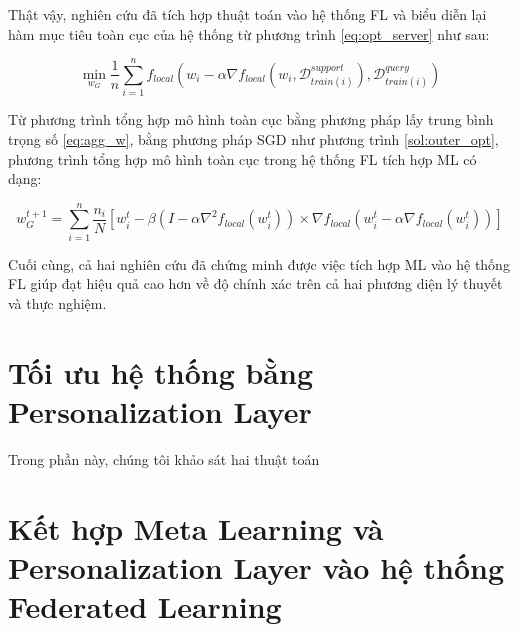 Thật vậy, nghiên cứu \cite{fallah2020personalized} đã tích hợp thuật toán  vào hệ thống FL và biểu diễn lại hàm mục tiêu toàn cục của hệ thống từ phương trình \ref{eq:opt_server} như sau:

\begin{equation}
    \label{eq:opt_meta_fl}
    \min_{w_G} \frac{1}{n} \sum_{i=1}^n f_{local}\left(w_i - \alpha \nabla f_{local}(w_i, \mathcal{D}_{train(i)}^{support}), \mathcal{D}_{train(i)}^{query}\right)
\end{equation}

Từ phương trình tổng hợp mô hình toàn cục bằng phương pháp lấy trung bình trọng số \ref{eq:agg_w}, bằng phương pháp SGD như phương trình \ref{sol:outer_opt}, phương trình tổng hợp mô hình toàn cục trong hệ thống FL tích hợp ML có dạng:

\begin{dmath}
    w_G^{t+1} = \sum_{i=1}^n{\frac{n_i}{N}\left[ w_i^t - \beta \left( I - \alpha \nabla^2 f_{local}(w_i^t) \right) \times \nabla f_{local}\left( w_i^t - \alpha\nabla f_{local}(w_i^t)\right) \right]}
\end{dmath}

Cuối cùng, cả hai nghiên cứu \parencite{chen2018federated, fallah2020personalized} đã chứng minh được việc tích hợp ML vào hệ thống FL giúp đạt hiệu quả cao hơn  về độ chính xác trên cả hai phương diện lý thuyết và thực nghiệm.

\section{Tối ưu hệ thống bằng Personalization Layer}


Trong phần này, chúng tôi khảo sát hai thuật toán 

\section{Kết hợp Meta Learning và Personalization Layer vào hệ thống Federated Learning}


